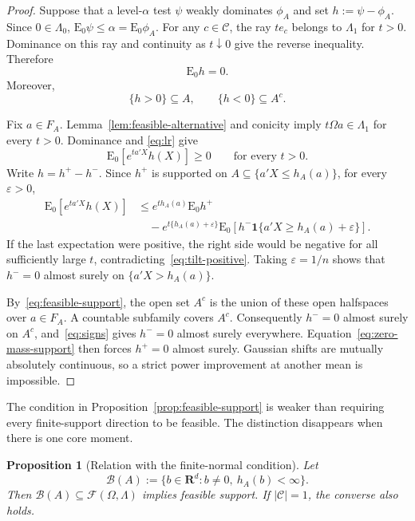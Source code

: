 \documentclass[12pt]{article}
\newtheorem{proposition}[theorem]{Proposition}
\theoremstyle{definition}
\theoremstyle{remark}
\newcommand{\E}{\mathrm E}
\newcommand{\R}{\mathbf R}
\newcommand{\cC}{\mathcal C}
\newcommand{\cF}{\mathcal F}
\newcommand{\cB}{\mathcal B}
\newcommand{\1}{\mathbf 1}
\begin{document}
\begin{proof}
Suppose that a level-$\alpha$ test $\psi$ weakly dominates $\phi_A$ and
set $h:=\psi-\phi_A$.  Since $0\in\Lambda_0$,
$\E_0\psi\le\alpha=\E_0\phi_A$.  For any $c\in\cC$, the ray
$te_c$ belongs to $\Lambda_1$ for $t>0$.  Dominance on this ray and
continuity as $t\downarrow0$ give the reverse inequality.  Therefore
\begin{equation}\label{eq:zero-mass-support}
\E_0h=0.
\end{equation}
Moreover,
\begin{equation}\label{eq:signs}
\{h>0\}\subseteq A,
\qquad
\{h<0\}\subseteq A^c.
\end{equation}

Fix $a\in F_A$.  Lemma~\ref{lem:feasible-alternative} and conicity imply
$t\Omega a\in\Lambda_1$ for every $t>0$.  Dominance and
\eqref{eq:lr} give
\begin{equation}\label{eq:tilt-positive}
\E_0[e^{ta'X}h(X)]\ge0
\qquad\text{for every }t>0.
\end{equation}
Write $h=h^+-h^-$.  Since $h^+$ is supported on
$A\subseteq\{a'X\le h_A(a)\}$, for every $\varepsilon>0$,
\begin{align*}
\E_0[e^{ta'X}h(X)]
&\le
e^{t h_A(a)}\E_0h^+\\
&\quad-
e^{t\{h_A(a)+\varepsilon\}}
\E_0\left[h^-\1\{a'X\ge h_A(a)+\varepsilon\}\right].
\end{align*}
If the last expectation were positive, the right side would be negative for
all sufficiently large $t$, contradicting~\eqref{eq:tilt-positive}.
Taking $\varepsilon=1/n$ shows that $h^-=0$ almost surely on
$\{a'X>h_A(a)\}$.

By~\eqref{eq:feasible-support}, the open set $A^c$ is the union of these
open halfspaces over $a\in F_A$.  A countable subfamily covers $A^c$.
Consequently $h^-=0$ almost surely on $A^c$, and~\eqref{eq:signs} gives
$h^-=0$ almost surely everywhere.  Equation~\eqref{eq:zero-mass-support}
then forces $h^+=0$ almost surely.  Gaussian shifts are mutually absolutely
continuous, so a strict power improvement at another mean is impossible.
\end{proof}

The condition in Proposition~\ref{prop:feasible-support} is weaker than
requiring every finite-support direction to be feasible.  The distinction
disappears when there is one core moment.

\begin{proposition}[Relation with the finite-normal condition]
\label{prop:relation}
Let
\[
\cB(A):=\{b\in\R^d:b\ne0,\ h_A(b)<\infty\}.
\]
Then $\cB(A)\subseteq\cF(\Omega,\Lambda)$ implies feasible support.  If
$|\cC|=1$, the converse also holds.
\end{proposition}
\end{document}
